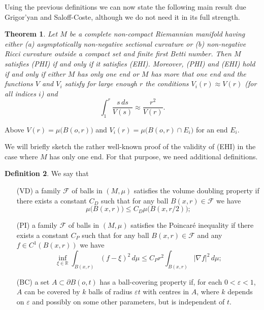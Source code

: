 \documentclass[10pt,a4paper,reqno]{amsart}
\newcommand{\R}{\mathbb{R}}
\numberwithin{equation}{section}
\theoremstyle{plain}
\newtheorem{thm}{Theorem}[section]
\theoremstyle{definition}
\newtheorem{defin}[thm]{Definition}
\begin{document}
Using the previous definitions we can now state the following  main result \cite[Theorem 1.1]{grisal} due Grigor'yan and Saloff-Coste, 
although we do not need it in its full strength. 
 
\begin{thm}\label{grisalmain}
 Let $M$ be a complete non-compact Riemannian manifold having either (a) asymptotically non-negative sectional curvature or (b) non-negative Ricci curvature outside a compact set and finite first Betti number. Then $M$ satisfies (PHI) if and only if it satisfies (EHI). Moreover, (PHI) and (EHI) hold if and only if either $M$ has only one end or $M$ has more that one end and the functions $V$ and $V_i$ satisfy for large enough $r$ the conditions
 $V_i(r)\approx V(r)$ (for all indices $i$) and 
 \[
\int_1^r\frac{s\,ds}{V(s)}\approx \frac{r^2}{V(r)}. 
 \]
\end{thm}
Above $V(r)=\mu\bigl(B(o,r)\bigr)$ and $V_i(r)=\mu\bigr(B(o,r)\cap E_i\bigr)$ for an end $E_i$.

We will briefly sketch the rather well-known proof of the validity of (EHI) in the case where $M$ has only one end. For that purpose, we need additional 
definitions.
\begin{defin}
 We say that
 \begin{enumerate}
	\item[(VD)] a family $\mathcal{F}$ of balls in $(M,\mu)$ satisfies the volume doubling property if there exists a 
	constant $C_D$ such that for any ball $B(x,r)\in\mathcal{F}$ we have
	  \[
	    \mu \big(B(x,r) \big) \le C_D \mu\big( B(x,r/2) \big);
	  \]	
	\item[(PI)] a family $\mathcal{F}$ of balls in $(M,\mu)$ satisfies the Poincar\'e inequality if there exists a constant $C_P$ such that
	for any ball $B(x,r)\in\mathcal{F}$ and any $f \in C^1(B(x,r))$ we have
	  \[
	    \inf_{\xi\in\R} \int_{B(x,r)} (f-\xi)^2 \, d\mu \le C_P r^2 \int_{B(x,r)} |\nabla f|^2 \, d\mu;
	  \]
	\item[(BC)] a set $A\subset\partial B(o,t)$ has a ball-covering property if, for each $0<\varepsilon<1$, $A$ can be covered by 
	  $k$ balls of radius $\varepsilon t$ with centres in $A$, where $k$ depends on $\varepsilon$ and possibly on some other parameters, 
	  but is independent of $t$.
\end{enumerate}
\end{defin}
\end{document}
